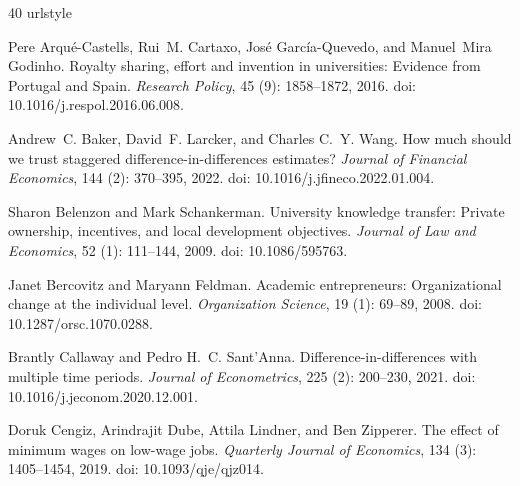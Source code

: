 \begin{thebibliography}{40}
\providecommand{\natexlab}[1]{#1}
\providecommand{\url}[1]{\texttt{#1}}
\expandafter\ifx\csname urlstyle\endcsname\relax
  \providecommand{\doi}[1]{doi: #1}\else
  \providecommand{\doi}{doi: \begingroup \urlstyle{rm}\Url}\fi

Pere Arqu{\'e}-Castells, Rui~M. Cartaxo, Jos{\'e} Garc{\'i}a-Quevedo, and
  Manuel~Mira Godinho.
\newblock Royalty sharing, effort and invention in universities: Evidence from
  {Portugal} and {Spain}.
\newblock \emph{Research Policy}, 45 (9): 1858--1872, 2016.
\newblock \doi{10.1016/j.respol.2016.06.008}.

Andrew~C. Baker, David~F. Larcker, and Charles C.~Y. Wang.
\newblock How much should we trust staggered difference-in-differences
  estimates?
\newblock \emph{Journal of Financial Economics}, 144 (2):
  370--395, 2022.
\newblock \doi{10.1016/j.jfineco.2022.01.004}.

Sharon Belenzon and Mark Schankerman.
\newblock University knowledge transfer: Private ownership, incentives, and
  local development objectives.
\newblock \emph{Journal of Law and Economics}, 52 (1):
  111--144, 2009.
\newblock \doi{10.1086/595763}.

Janet Bercovitz and Maryann Feldman.
\newblock Academic entrepreneurs: Organizational change at the individual
  level.
\newblock \emph{Organization Science}, 19 (1): 69--89, 2008.
\newblock \doi{10.1287/orsc.1070.0288}.

Brantly Callaway and Pedro H.~C. Sant'Anna.
\newblock Difference-in-differences with multiple time periods.
\newblock \emph{Journal of Econometrics}, 225 (2): 200--230,
  2021.
\newblock \doi{10.1016/j.jeconom.2020.12.001}.

Doruk Cengiz, Arindrajit Dube, Attila Lindner, and Ben Zipperer.
\newblock The effect of minimum wages on low-wage jobs.
\newblock \emph{Quarterly Journal of Economics}, 134 (3):
  1405--1454, 2019.
\newblock \doi{10.1093/qje/qjz014}.


\end{thebibliography}
